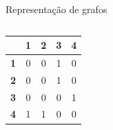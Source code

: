 \begin{frame}[t]{Representação de grafos}
\begin{columns}[c]
\begin{column}{0.6\textwidth}
\begin{columns}[c]
{				\begin{column}{3.5cm}
					\begin{table}
						\def\arraystretch{1.2}
						\color{black}
						\begin{tabular}{c|cccc}
							& \textbf{1} & \textbf{2} & \textbf{3} & \textbf{4} \\ \hline
							\textbf{1} &     0      &     0      &     1      &     0      \\
							\textbf{2} &     0      &     0      &     1      &     0      \\
							\textbf{3} &     0      &     0      &     0      &     1      \\
							\textbf{4} &     1      &     1      &     0      &     0
						\end{tabular}
					\end{table}
				\end{column}
				}
		\end{columns}	
		
		\end{column}
		\begin{column}{0.18\textwidth}\end{column}
	\end{columns}
\end{frame}



